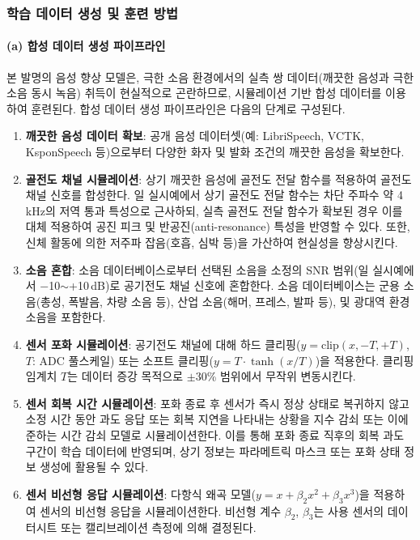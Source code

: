 \documentclass{article}
\DeclareRobustCommand{\vtwoedit}[1]{\textcolor{customgreen}{#1}}
\begin{document}
\subsubsection{학습 데이터 생성 및 훈련 방법}

\paragraph{(a) 합성 데이터 생성 파이프라인}

본 발명의 음성 향상 모델은, 극한 소음 환경에서의 실측 쌍 데이터(깨끗한 음성과 극한 소음 동시 녹음) 취득이 현실적으로 곤란하므로, 시뮬레이션 기반 합성 데이터를 이용하여 훈련된다. 합성 데이터 생성 파이프라인은 다음의 단계로 구성된다.

\begin{enumerate}
    \item \textbf{깨끗한 음성 데이터 확보}: 공개 음성 데이터셋(예: LibriSpeech, VCTK, KsponSpeech 등)으로부터 다양한 화자 및 발화 조건의 깨끗한 음성을 확보한다.
    
    \item \textbf{골전도 채널 시뮬레이션}: 상기 깨끗한 음성에 골전도 전달 함수를 적용하여 골전도 채널 신호를 합성한다. 일 실시예에서 상기 골전도 전달 함수는 차단 주파수 약 4\,kHz의 저역 통과 특성으로 근사하되, 실측 골전도 전달 함수가 확보된 경우 이를 대체 적용하여 공진 피크 및 반공진(anti-resonance) 특성을 반영할 수 있다. 또한, 신체 활동에 의한 저주파 잡음(호흡, 심박 등)을 가산하여 현실성을 향상시킨다.
    
    \item \textbf{소음 혼합}: 소음 데이터베이스로부터 선택된 소음을 소정의 SNR 범위(일 실시예에서 $-$10$\sim$+10\,dB)로 공기전도 채널 신호에 혼합한다. 소음 데이터베이스는 군용 소음(총성, 폭발음, 차량 소음 등), 산업 소음(해머, 프레스, 발파 등), 및 광대역 환경 소음을 포함한다.
    
    \item \textbf{센서 포화 시뮬레이션}: 공기전도 채널에 대해 하드 클리핑($y = \mathrm{clip}(x, -T, +T)$, $T$: ADC 풀스케일) 또는 소프트 클리핑($y = T \cdot \tanh(x/T)$)을 적용한다. 클리핑 임계치 $T$는 데이터 증강 목적으로 $\pm$30\% 범위에서 무작위 변동시킨다.
    
    \item \vtwoedit{\textbf{센서 회복 시간 시뮬레이션}: 포화 종료 후 센서가 즉시 정상 상태로 복귀하지 않고 소정 시간 동안 과도 응답 또는 회복 지연을 나타내는 상황을 지수 감쇠 또는 이에 준하는 시간 감쇠 모델로 시뮬레이션한다. 이를 통해 포화 종료 직후의 회복 과도 구간이 학습 데이터에 반영되며, 상기 정보는 파라메트릭 마스크 또는 포화 상태 정보 생성에 활용될 수 있다.}
    
    \item \textbf{센서 비선형 응답 시뮬레이션}: 다항식 왜곡 모델($y = x + \beta_2 x^2 + \beta_3 x^3$)을 적용하여 센서의 비선형 응답을 시뮬레이션한다. 비선형 계수 $\beta_2$, $\beta_3$는 사용 센서의 데이터시트 또는 캘리브레이션 측정에 의해 결정된다.
\end{enumerate}
\end{document}

